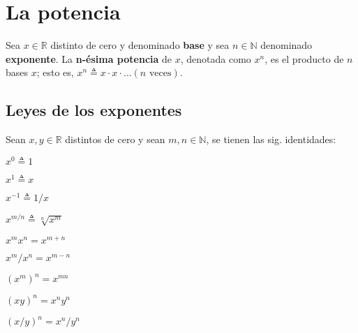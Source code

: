 \chapter{La potencia}

Sea \(x\in\mathbb{R}\) distinto de cero y denominado \textbf{base} y sea \(n\in\mathbb{N}\) denominado \textbf{exponente}. 
La \textbf{n-ésima potencia} de \(x\), denotada como \(x^n\), es el producto de \(n\) bases \(x\); esto es, \(x^n\triangleq x\cdot x\cdot\dots(n\text{ veces})\).

\section{Leyes de los exponentes}

Sean \(x,y\in\mathbb{R}\) distintos de cero y sean \(m,n\in\mathbb{N}\), se tienen las sig. identidades:
\begin{enumerate}
  \begin{multicols}{3}
    \item \(x^{0}\triangleq1\)
    \item \(x^{1}\triangleq x\)
    \item \(x^{-1}\triangleq1/x\)
    \item \(x^{m/n}\triangleq\sqrt[n]{x^{m}}\)
    \item \(x^{m}x^{n}=x^{m+n}\)
    \item \(x^{m}/x^{n}=x^{m-n}\)
    \item \((x^{m})^{n}=x^{mn}\)
    \item \((xy)^{n}=x^{n}y^{n}\)
    \item \((x/y)^{n}=x^{n}/y^{n}\)
  \end{multicols}
\end{enumerate}

